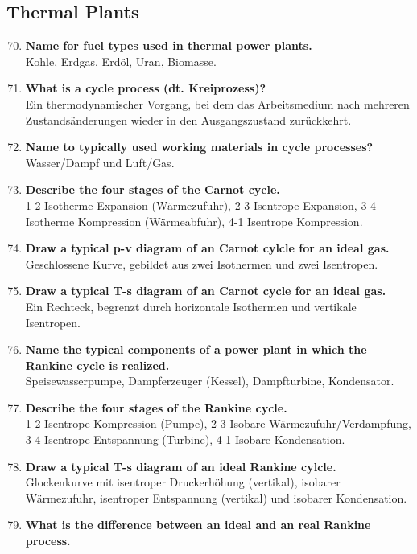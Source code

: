 \documentclass{article}
\begin{document}
\subsection*{Thermal Plants}
\begin{enumerate}
    \setcounter{enumi}{69}
    \item \textbf{Name for fuel types used in thermal power plants.} \\
    Kohle, Erdgas, Erdöl, Uran, Biomasse.
    \item \textbf{What is a cycle process (dt. Kreiprozess)?} \\
    Ein thermodynamischer Vorgang, bei dem das Arbeitsmedium nach mehreren Zustandsänderungen wieder in den Ausgangszustand zurückkehrt.
    \item \textbf{Name to typically used working materials in cycle processes?} \\
    Wasser/Dampf und Luft/Gas.
    \item \textbf{Describe the four stages of the Carnot cycle.} \\
    1-2 Isotherme Expansion (Wärmezufuhr), 2-3 Isentrope Expansion, 3-4 Isotherme Kompression (Wärmeabfuhr), 4-1 Isentrope Kompression.
    \item \textbf{Draw a typical p-v diagram of an Carnot cylcle for an ideal gas.} \\
    Geschlossene Kurve, gebildet aus zwei Isothermen und zwei Isentropen.
    \item \textbf{Draw a typical T-s diagram of an Carnot cycle for an ideal gas.} \\
    Ein Rechteck, begrenzt durch horizontale Isothermen und vertikale Isentropen.
    \item \textbf{Name the typical components of a power plant in which the Rankine cycle is realized.} \\
    Speisewasserpumpe, Dampferzeuger (Kessel), Dampfturbine, Kondensator.
    \item \textbf{Describe the four stages of the Rankine cycle.} \\
    1-2 Isentrope Kompression (Pumpe), 2-3 Isobare Wärmezufuhr/Verdampfung, 3-4 Isentrope Entspannung (Turbine), 4-1 Isobare Kondensation.
    \item \textbf{Draw a typical T-s diagram of an ideal Rankine cylcle.} \\
    Glockenkurve mit isentroper Druckerhöhung (vertikal), isobarer Wärmezufuhr, isentroper Entspannung (vertikal) und isobarer Kondensation.
    \item \textbf{What is the difference between an ideal and an real Rankine process.} \\

\end{enumerate}
\end{document}
